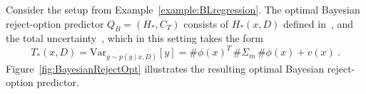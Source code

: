 \begin{example}
\label{example:BayesianRejectOption}
Consider the setup from Example~\ref{example:BLregression}. The optimal Bayesian reject-option predictor $Q_B=(H_*,C_T)$ consists of $H_*(x, D)$ defined in~, and the total uncertainty~, which in this setting takes the form
\begin{equation}
\label{equ:TotalCondRiskLinReg}
  T_*(x, D) = \mathrm{Var}_{y \sim p(y \mid x, D)}[y] = \#\phi(x)^T\, \#\Sigma_m\, \#\phi(x) + v(x) \:.
\end{equation}
%
Figure~\ref{fig:BayesianRejectOpt} illustrates the resulting optimal Bayesian reject-option predictor.
\end{example}
